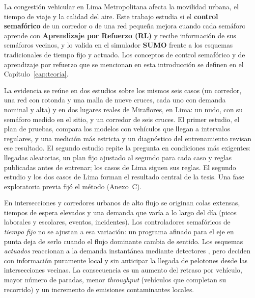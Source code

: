 

La congestión vehicular en Lima Metropolitana afecta la movilidad urbana, el tiempo de viaje y la calidad del aire. Este trabajo estudia si el \textbf{control semafórico} de un corredor o de una red pequeña mejora cuando cada semáforo aprende con \textbf{Aprendizaje por Refuerzo (RL)} y recibe información de sus semáforos vecinos, y lo valida en el simulador \textbf{SUMO} frente a los esquemas tradicionales de tiempo fijo y actuado. Los conceptos de control semafórico y de aprendizaje por refuerzo que se mencionan en esta introducción se definen en el Capítulo~\ref{cap:teoria}.

La evidencia se reúne en dos estudios sobre los mismos seis casos (un corredor, una red con rotonda y una malla de nueve cruces, cada uno con demanda nominal y alta) y en dos lugares reales de Miraflores, en Lima: un nudo, con su semáforo medido en el sitio, y un corredor de seis cruces. El primer estudio, el plan de pruebas, compara los modelos con vehículos que llegan a intervalos regulares, y una medición más estricta y un diagnóstico del entrenamiento revisan ese resultado. El segundo estudio repite la pregunta en condiciones más exigentes: llegadas aleatorias, un plan fijo ajustado al segundo para cada caso y reglas publicadas antes de entrenar; los casos de Lima siguen sus reglas. El segundo estudio y los dos casos de Lima forman el resultado central de la tesis. Una fase exploratoria previa fijó el método (Anexo~C).


En intersecciones y corredores urbanos de alto flujo se originan colas extensas, tiempos de espera elevados y una demanda que varía a lo largo del día (picos laborales y escolares, eventos, incidentes). Los controladores semafóricos de \textit{tiempo fijo} no se ajustan a esa variación: un programa afinado para el eje en punta deja de serlo cuando el flujo dominante cambia de sentido. Los esquemas \textit{actuados} reaccionan a la demanda instantánea mediante detectores \citep{SUMO_TLS_Actuated}, pero deciden con información puramente local y sin anticipar la llegada de pelotones desde las intersecciones vecinas. La consecuencia es un aumento del retraso por vehículo, mayor número de paradas, menor \textit{throughput} (vehículos que completan su recorrido) y un incremento de emisiones contaminantes locales.

